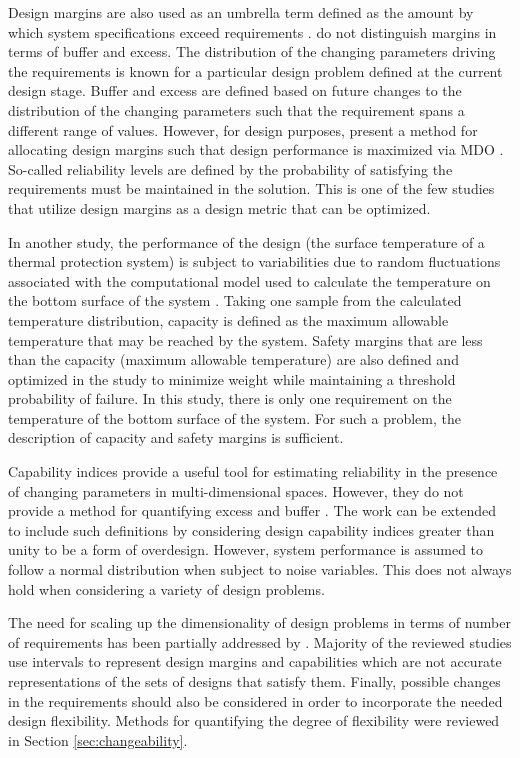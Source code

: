 Design margins are also used as an umbrella term defined as the amount by which system specifications exceed requirements \cite{Cross2015}. \citeauthor{Cross2015} do not distinguish margins in terms of buffer and excess. The distribution of the changing parameters driving the requirements is known for a particular design problem defined at the current design stage. Buffer and excess are defined based on future changes to the distribution of the changing parameters such that the requirement spans a different range of values. However, for design purposes, \citeauthor{Cross2015} present a method for allocating design margins such that design performance is maximized via \ac{MDO} \cite{Cross2015}. So-called reliability levels are defined by the probability of satisfying the requirements must be maintained in the solution. This is one of the few studies that utilize design margins as a design metric that can be optimized. 

In another study, the performance of the design (the surface temperature of a thermal protection system) is subject to variabilities due to random fluctuations associated with the computational model used to calculate the temperature on the bottom surface of the system \cite{Villanueva2014}. Taking one sample from the calculated temperature distribution, capacity is defined as the maximum allowable temperature that may be reached by the system. Safety margins that are less than the capacity (maximum allowable temperature) are also defined and optimized in the study to minimize weight while maintaining a threshold probability of failure. In this study, there is only one requirement on the temperature of the bottom surface of the system. For such a problem, the description of capacity and safety margins is sufficient. 

Capability indices provide a useful tool for estimating reliability in the presence of changing parameters in multi-dimensional spaces. However, they do not provide a method for quantifying excess and buffer \cite{Chen1999}. The work can be extended to include such definitions by considering design capability indices greater than unity to be a form of overdesign. However, system performance is assumed to follow a normal distribution when subject to noise variables. This does not always hold when considering a variety of design problems.

The need for scaling up the dimensionality of design problems in terms of number of requirements has been partially addressed by \citeauthor{Chen1999} \cite{Chen1999}. Majority of the reviewed studies use intervals to represent design margins and capabilities  which are not accurate representations of the sets of designs that satisfy them. Finally, possible changes in the requirements should also be considered in order to incorporate the needed design flexibility. Methods for quantifying the degree of flexibility were reviewed in Section \ref{sec:changeability}.

